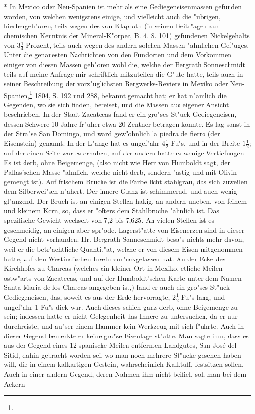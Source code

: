 \documentclass[a4paper, 11pt, oneside, polutonikogreek, german]{article}
\begin{document}
* In Mexico oder Neu-Spanien ist mehr als eine Gediegeneisenmassen gefunden worden, von welchen wenigstens einige, und vielleicht auch die "ubrigen, hierhergeh"oren, teils wegen des von Klaproth (in seinen Beitr"agen zur chemischen Kenntnis der Mineral-K"orper, B. 4. S. 101) gefundenen Nickelgehalts von $\mathfrak{3\frac{1}{4}}$ Prozent, teils auch wegen des andern solchen Massen "ahnlichen Gef"uges. Unter die genauesten Nachrichten von den Fundorten und dem Vorkommen einiger von diesen Massen geh"oren wohl die, welche der Bergrath Sonneschmidt teils auf meine Anfrage mir schriftlich mitzuteilen die G"ute hatte, teils auch in seiner Beschreibung der vorz"uglichsten Bergwerks-Reviere in Mexiko oder Neu-Spanien,\footnote{} 1804, S. 192 und 288, bekannt gemacht hat; er hat n"amlich die Gegenden, wo sie sich finden, bereiset, und die Massen aus eigener Ansicht beschrieben. In der Stadt Zacatecas fand er ein gro"ses St"uck Gediegeneisen, dessen Schwere 10 Jahre fr"uher etwa 20 Zentner betragen konnte. Es lag sonst in der Stra"se San Domingo, und ward gew"ohnlich la piedra de fierro (der Eisenstein) genannt. In der L"ange hat es ungef"ahr $\mathfrak{4\frac{1}{2}}$ Fu"s, und in der Breite $\mathfrak{1\frac{1}{2}}$; auf der einen Seite war es erhaben, auf der andern hatte es wenige Vertiefungen. Es ist derb, ohne Beigemenge, (also nicht wie Herr von Humboldt sagt, der Pallas'schen Masse "ahnlich, welche nicht derb, sondern "astig und mit Olivin gemengt ist). Auf frischem Bruche ist die Farbe licht stahlgrau, das sich zuweilen dem Silberwei"sen n"ahert. Der innere Glanz ist schimmernd, und auch wenig gl"anzend. Der Bruch ist an einigen Stellen hakig, an andern uneben, von feinem und kleinem Korn, so, dass er "ofters dem Stahlbruche "ahnlich ist. Das spezifische Gewicht wechselt von 7,2 bis 7,625. An vielen Stellen ist es geschmeidig, an einigen aber spr"ode. Lagerst"atte von Eisenerzen sind in dieser Gegend nicht vorhanden. Hr. Bergrath Sonneschmidt besa"s nichts mehr davon, weil er die betr"achtliche Quantit"at, welche er von diesem Eisen mitgenommen hatte, auf den Westindischen Inseln zur"uckgelassen hat. An der Ecke des Kirchhofes zu Charcas (welches ein kleiner Ort in Mexiko, etliche Meilen ostw"arts von Zacatecas, und auf der Humboldt'schen Karte unter dem Namen Santa Maria de los Charcas angegeben ist,) fand er auch ein gro"ses St"uck Gediegeneisen, das, soweit es aus der Erde hervorragte, $\mathfrak{2\frac{1}{2}}$ Fu"s lang, und ungef"ahr 1 Fu"s dick war. Auch dieses schien ganz derb, ohne Beigemenge zu sein; indessen hatte er nicht Gelegenheit das Innere zu untersuchen, da er nur durchreiste, und au"ser einem Hammer kein Werkzeug mit sich f"uhrte. Auch in dieser Gegend bemerkte er keine gro"se Eisenlagerst"atte. Man sagte ihm, dass es aus der Gegend eines 12 spanische Meilen entfernten Landgutes, San José del Sitid, dahin gebracht worden sei, wo man noch mehrere St"ucke gesehen haben will, die in einem kalkartigen Gestein, wahrscheinlich Kalktuff, festsitzen sollen. Auch in einer andern Gegend, deren Nahmen ihm nicht beifiel, soll man bei dem Ackern 
\end{document}
